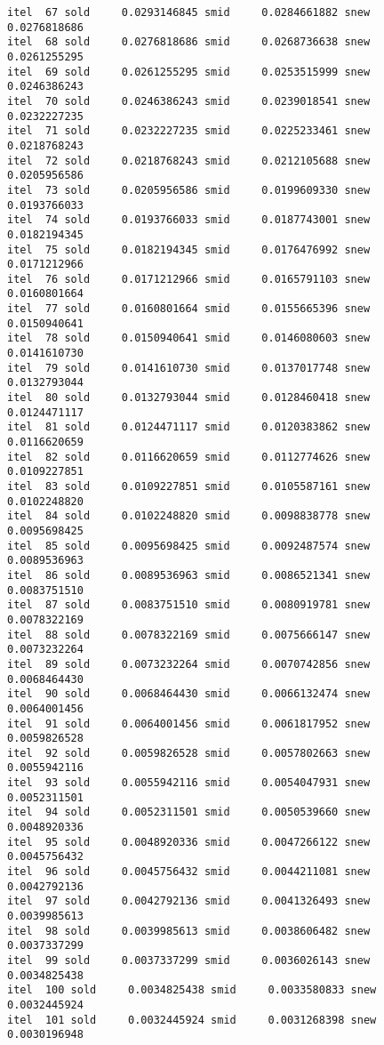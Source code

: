 \documentclass[
  12pt,
  letterpaper,
  DIV=11,
  numbers=noendperiod]{scrartcl}
\begin{document}
\begin{verbatim}
itel  67 sold     0.0293146845 smid     0.0284661882 snew     0.0276818686 
itel  68 sold     0.0276818686 smid     0.0268736638 snew     0.0261255295 
itel  69 sold     0.0261255295 smid     0.0253515999 snew     0.0246386243 
itel  70 sold     0.0246386243 smid     0.0239018541 snew     0.0232227235 
itel  71 sold     0.0232227235 smid     0.0225233461 snew     0.0218768243 
itel  72 sold     0.0218768243 smid     0.0212105688 snew     0.0205956586 
itel  73 sold     0.0205956586 smid     0.0199609330 snew     0.0193766033 
itel  74 sold     0.0193766033 smid     0.0187743001 snew     0.0182194345 
itel  75 sold     0.0182194345 smid     0.0176476992 snew     0.0171212966 
itel  76 sold     0.0171212966 smid     0.0165791103 snew     0.0160801664 
itel  77 sold     0.0160801664 smid     0.0155665396 snew     0.0150940641 
itel  78 sold     0.0150940641 smid     0.0146080603 snew     0.0141610730 
itel  79 sold     0.0141610730 smid     0.0137017748 snew     0.0132793044 
itel  80 sold     0.0132793044 smid     0.0128460418 snew     0.0124471117 
itel  81 sold     0.0124471117 smid     0.0120383862 snew     0.0116620659 
itel  82 sold     0.0116620659 smid     0.0112774626 snew     0.0109227851 
itel  83 sold     0.0109227851 smid     0.0105587161 snew     0.0102248820 
itel  84 sold     0.0102248820 smid     0.0098838778 snew     0.0095698425 
itel  85 sold     0.0095698425 smid     0.0092487574 snew     0.0089536963 
itel  86 sold     0.0089536963 smid     0.0086521341 snew     0.0083751510 
itel  87 sold     0.0083751510 smid     0.0080919781 snew     0.0078322169 
itel  88 sold     0.0078322169 smid     0.0075666147 snew     0.0073232264 
itel  89 sold     0.0073232264 smid     0.0070742856 snew     0.0068464430 
itel  90 sold     0.0068464430 smid     0.0066132474 snew     0.0064001456 
itel  91 sold     0.0064001456 smid     0.0061817952 snew     0.0059826528 
itel  92 sold     0.0059826528 smid     0.0057802663 snew     0.0055942116 
itel  93 sold     0.0055942116 smid     0.0054047931 snew     0.0052311501 
itel  94 sold     0.0052311501 smid     0.0050539660 snew     0.0048920336 
itel  95 sold     0.0048920336 smid     0.0047266122 snew     0.0045756432 
itel  96 sold     0.0045756432 smid     0.0044211081 snew     0.0042792136 
itel  97 sold     0.0042792136 smid     0.0041326493 snew     0.0039985613 
itel  98 sold     0.0039985613 smid     0.0038606482 snew     0.0037337299 
itel  99 sold     0.0037337299 smid     0.0036026143 snew     0.0034825438 
itel  100 sold     0.0034825438 smid     0.0033580833 snew     0.0032445924 
itel  101 sold     0.0032445924 smid     0.0031268398 snew     0.0030196948 

\end{verbatim}
\end{document}
